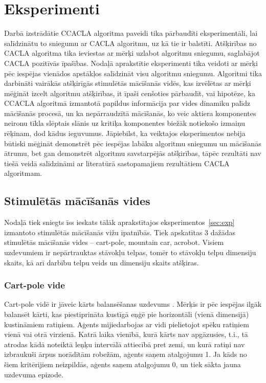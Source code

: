 \documentclass{ludis} %
\begin{document}
\chapter{Eksperimenti}
Darbā izstrādātie CCACLA algoritma paveidi tika pārbaudīti eksperimentāli, lai
salīdzinātu to sniegumu ar CACLA algoritmu, uz kā tie ir balstīti. Atšķirības no
CACLA algoritma tika ieviestas ar mērķi uzlabot algoritmu sniegumu, saglabājot
CACLA pozitīvās īpašības. Nodaļā aprakstītie eksperimenti tika veidoti ar mērķi
pēc iespējas vienādos apstākļos salīdzināt visu algoritmu sniegumu. Algoritmi
tika darbināti vairākās atšķirīgās stimulētās mācīšanās vidēs, kas izvēlētas ar
mērķi mēģināt izcelt algoritmu atšķirības, it īpaši cenšoties pārbaudīt, vai
hipotēze, ka CCACLA algoritmā izmantotā papildus informācija par vides dinamiku
palīdz mācīšanās procesā, un ka nepārraudzītā mācīšanās, ko veic aktiera
komponentes neironu tīkla slēptais slānis uz kritiķa komponentes biežāk
notiekošo izmaiņu rēķinam, dod kādus ieguvumus. Jāpiebilst, ka veiktajos
eksperimentos nebija būtiski mēģināt demonstrēt pēc iespējas labāku algoritmu
sniegumu un mācīšanās ātrumu, bet gan demonstrēt algoritmu savstarpējās
atšķirības, tāpēc rezultāti nav tiešā veidā salīdzināmi ar literatūrā
sastopamajiem rezultātiem CACLA algoritmam.

\section{Stimulētās mācīšanās vides}
Nodaļā tiek sniegts īss ieskats tālāk aprakstītajos eksperimentos~\ref{sec:exp}
izmantoto stimulētās mācīšanās vižu īpatnībās. Tiek apskatītas 3 dažādas
stimulētās mācīšanās vides -- cart-pole, mountain car, acrobot.
Visiem uzdevumiem ir nepārtrauktas stāvokļu telpas, tomēr to stāvokļu telpu
dimensiju skaits, kā arī darbību telpu veids un dimensiju skaits atšķiras.

\subsection{Cart-pole vide}
Cart-pole vidē ir jāveic kārts balansēšanas uzdevums \autocite{Barto}. Mērķis ir
pēc iespējas ilgāk balansēt kārti, kas piestiprināta kustīgā eņģē pie
horizontāli (vienā dimensijā) kustināmiem ratiņiem. Aģents mijiedarbojas ar vidi
pielietojot spēku ratiņiem vienā vai otrā virzienā. Katrā laika vienībā, kurā
kārts nav apgāzusies, t.i., tā atrodas kādā noteiktā leņķu intervālā attiecībā
pret zemi, un kurā ratiņi nav izbraukuši ārpus norādītām robežām, aģents saņem
atalgojumu 1. Ja kāds no šiem kritērijiem neizpildās, aģents saņem atalgojumu 0,
un tiek sākta jauna uzdevuma epizode.
\end{document}
